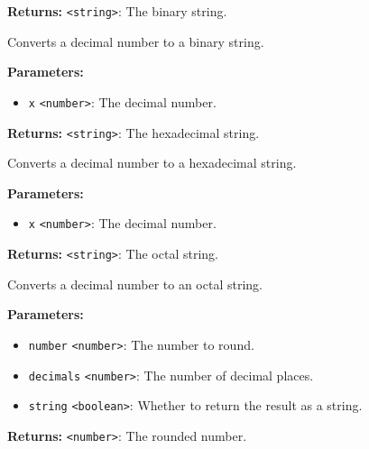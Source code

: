 \documentclass[12pt,a4paper]{article}
\begin{document}
\noindent \textbf{Returns:} \texttt{<string>}: The binary string.

\noindent Converts a decimal number to a binary string.

\vspace{5mm}
\noindent {}


\noindent \textbf{Parameters:}
\begin{itemize}
  \item \texttt{x} \texttt{<number>}: The decimal number.
\end{itemize}

\noindent \textbf{Returns:} \texttt{<string>}: The hexadecimal string.

\noindent Converts a decimal number to a hexadecimal string.

\vspace{5mm}
\noindent {}


\noindent \textbf{Parameters:}
\begin{itemize}
  \item \texttt{x} \texttt{<number>}: The decimal number.
\end{itemize}

\noindent \textbf{Returns:} \texttt{<string>}: The octal string.

\noindent Converts a decimal number to an octal string.

\vspace{5mm}
\noindent {}


\noindent \textbf{Parameters:}
\begin{itemize}
  \item \texttt{number} \texttt{<number>}: The number to round.
  \item \texttt{decimals} \texttt{<number>}: The number of decimal places.
  \item \texttt{string} \texttt{<boolean>}: Whether to return the result as a string.
\end{itemize}

\noindent \textbf{Returns:} \texttt{<number>}: The rounded number.
\end{document}
